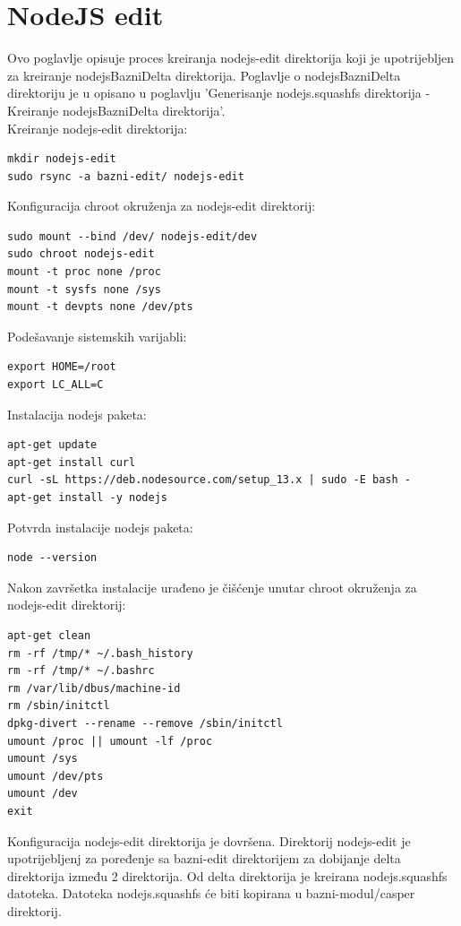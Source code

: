 \documentclass[12pt,vi]{mitthesis}
\begin{document}
\section*{NodeJS edit}
\indent
Ovo poglavlje opisuje proces kreiranja nodejs-edit direktorija koji je upotrijebljen za kreiranje nodejsBazniDelta direktorija. Poglavlje o nodejsBazniDelta direktoriju je u opisano u poglavlju 'Generisanje nodejs.squashfs direktorija - Kreiranje nodejsBazniDelta direktorija'.\\
Kreiranje nodejs-edit direktorija:
\begin{lstlisting}[style=BashInputStyle]
mkdir nodejs-edit
sudo rsync -a bazni-edit/ nodejs-edit
\end{lstlisting}
\noindent
Konfiguracija chroot okruženja za nodejs-edit direktorij:
\begin{lstlisting}[style=BashInputStyle]
sudo mount --bind /dev/ nodejs-edit/dev
sudo chroot nodejs-edit
mount -t proc none /proc
mount -t sysfs none /sys
mount -t devpts none /dev/pts
\end{lstlisting}
\noindent
Podešavanje sistemskih varijabli:
\begin{lstlisting}[style=BashInputStyle]
export HOME=/root
export LC_ALL=C
\end{lstlisting}
\noindent
Instalacija nodejs paketa:
\begin{lstlisting}[style=BashInputStyle]
apt-get update
apt-get install curl
curl -sL https://deb.nodesource.com/setup_13.x | sudo -E bash -
apt-get install -y nodejs
\end{lstlisting}
\noindent
Potvrda instalacije nodejs paketa:
\begin{lstlisting}[style=BashInputStyle]
node --version
\end{lstlisting}
\noindent
Nakon završetka instalacije urađeno je čišćenje unutar chroot okruženja za nodejs-edit direktorij:
\begin{lstlisting}[style=BashInputStyle]
apt-get clean
rm -rf /tmp/* ~/.bash_history
rm -rf /tmp/* ~/.bashrc
rm /var/lib/dbus/machine-id
rm /sbin/initctl
dpkg-divert --rename --remove /sbin/initctl
umount /proc || umount -lf /proc
umount /sys
umount /dev/pts
umount /dev
exit
\end{lstlisting}

Konfiguracija nodejs-edit direktorija je dovršena. Direktorij nodejs-edit je upotrijebljenj za poređenje sa bazni-edit direktorijem za dobijanje delta direktorija između 2 direktorija. Od delta direktorija je kreirana nodejs.squashfs datoteka. Datoteka nodejs.squashfs će biti kopirana u bazni-modul/casper direktorij.
\end{document}

